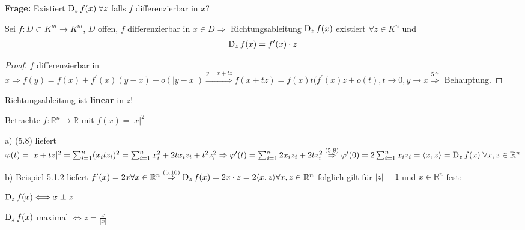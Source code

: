 \textbf{Frage:} Existiert $\operatorname{D}_z f(x)\; \forall z$ falls $f$ differenzierbar in $x$?

\begin{satz}\label{satz:Richtungsableitung_linear}
    Sei $f : D \subset K^m \to K^m$, $D$ offen, $f$ differenzierbar in $x \in D \Rightarrow$ Richtungsableitung $\operatorname{D}_z f(x)$ existiert $\forall z \in K^n$ und 
    \begin{align}
    \operatorname{D}_z f(x) = f^{\prime}(x)\cdot z
    \end{align}
\end{satz}

\begin{proof}
    $f$ differenzierbar in $x \Rightarrow f(y) = f(x) + f^{\prime}(x)(y-x) + o(\vert y-x\vert) \overset{y=x+tz}{\Rightarrow} f(x+tz) = f(x) t(f^{\prime}(x)z + o(t), t \to 0, y \to x \overset{5.7}{\Rightarrow}$ Behauptung.
\end{proof}

\begin{bemerkung}
	Richtungsableitung ist \textbf{linear} in $z$!
\end{bemerkung}

\begin{beispiel}
    Betrachte $f: \mathbb{R}^n \to \mathbb{R}$ mit $f(x) = \vert x \vert^2$
    \begin{compactitem}
        \item[a)] (5.8) liefert $\varphi(t) = \vert x + tz\vert^2 = \sum_{i=1}^{n} (x_i t z_i)^2 = \sum_{i=1}^{n} x_i^2 + 2t x_i z_i + t^2 z_i^2 \Rightarrow \varphi^{\prime}(t) = \sum_{i=1}^{n} 2x_i z_i + 2t z_i^2 \overset{(5.8)}{\Rightarrow} \varphi^{\prime}(0) = 2 \sum_{i=1}^{n} x_i z_i = \langle x,z \rangle = \operatorname{D}_z  f(x)\; \forall x,z \in \mathbb{R}^n$
        \item[b)] Beispiel 5.1.2 liefert $f^{\prime}(x) = 2x \forall x \in \mathbb{R}^n \overset{(5.10)}{\Rightarrow} \operatorname{D}_z f(x) = 2x \cdot z = 2 \langle x,z \rangle \forall x,z \in \mathbb{R}^n$ folglich gilt für $\vert z \vert = 1$ und $x \in \mathbb{R}^n$ fest:
        \begin{compactitem}[\textbullet]
            \item $\operatorname{D}_z f(x) \Longleftrightarrow x \perp z$
            \item $\operatorname{D}_z f(x)$ maximal $\Longleftrightarrow z = \frac{x}{\vert x \vert}$
        \end{compactitem}
    \end{compactitem}
\end{beispiel}

